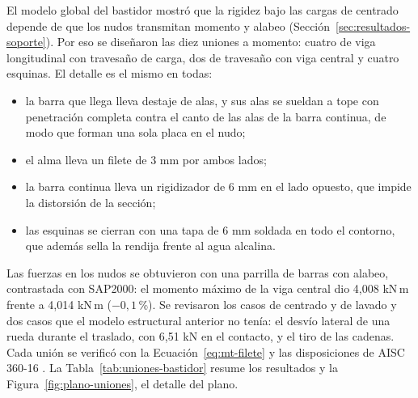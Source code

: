 El modelo global del bastidor mostró que la rigidez bajo las cargas de centrado depende de que los nudos transmitan momento y alabeo (Sección~\ref{sec:resultados-soporte}). Por eso se diseñaron las diez uniones a momento: cuatro de viga longitudinal con travesaño de carga, dos de travesaño con viga central y cuatro esquinas. El detalle es el mismo en todas:
\begin{itemize}
\item la barra que llega lleva destaje de alas, y sus alas se sueldan a tope con penetración completa contra el canto de las alas de la barra continua, de modo que forman una sola placa en el nudo;
\item el alma lleva un filete de 3 mm por ambos lados;
\item la barra continua lleva un rigidizador de 6 mm en el lado opuesto, que impide la distorsión de la sección;
\item las esquinas se cierran con una tapa de 6 mm soldada en todo el contorno, que además sella la rendija frente al agua alcalina.
\end{itemize}

Las fuerzas en los nudos se obtuvieron con una parrilla de barras con alabeo, contrastada con SAP2000: el momento máximo de la viga central dio 4,008 kN\,m frente a 4,014 kN\,m ($-0{,}1$\,\%). Se revisaron los casos de centrado y de lavado y dos casos que el modelo estructural anterior no tenía: el desvío lateral de una rueda durante el traslado, con 6,51 kN en el contacto, y el tiro de las cadenas. Cada unión se verificó con la Ecuación~\eqref{eq:mt-filete} y las disposiciones de AISC 360-16 \cite{aisc360}. La Tabla~\ref{tab:uniones-bastidor} resume los resultados y la Figura~\ref{fig:plano-uniones}, el detalle del plano.

